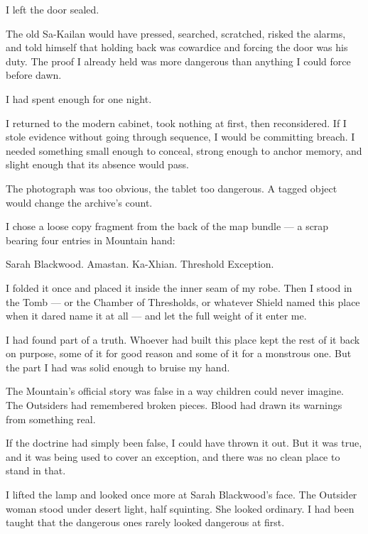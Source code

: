 I left the door sealed.\par

The old Sa-Kailan would have pressed, searched, scratched, risked the alarms, and told himself that holding back was cowardice and forcing the door was his duty. The proof I already held was more dangerous than anything I could force before dawn.\par

I had spent enough for one night.\par

I returned to the modern cabinet, took nothing at first, then reconsidered. If I stole evidence without going through sequence, I would be committing breach. I needed something small enough to conceal, strong enough to anchor memory, and slight enough that its absence would pass.\par

The photograph was too obvious, the tablet too dangerous. A tagged object would change the archive's count.\par

I chose a loose copy fragment from the back of the map bundle --- a scrap bearing four entries in Mountain hand:\par

Sarah Blackwood. Amastan. Ka-Xhian. Threshold Exception.\par

I folded it once and placed it inside the inner seam of my robe. Then I stood in the Tomb --- or the Chamber of Thresholds, or whatever Shield named this place when it dared name it at all --- and let the full weight of it enter me.\par

I had found part of a truth. Whoever had built this place kept the rest of it back on purpose, some of it for good reason and some of it for a monstrous one. But the part I had was solid enough to bruise my hand.\par

The Mountain's official story was false in a way children could never imagine. The Outsiders had remembered broken pieces. Blood had drawn its warnings from something real.\par

If the doctrine had simply been false, I could have thrown it out. But it was true, and it was being used to cover an exception, and there was no clean place to stand in that.\par

I lifted the lamp and looked once more at Sarah Blackwood's face. The Outsider woman stood under desert light, half squinting. She looked ordinary. I had been taught that the dangerous ones rarely looked dangerous at first.\par

